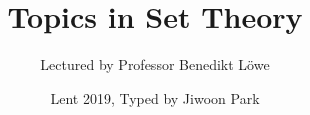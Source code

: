 \documentclass[12pt,a4paper]{article}
\newcommand{\latinmodern}[1]{{\fontfamily{lmss}\selectfont
\textbf{#1}
}}
\DeclarePairedDelimiter\bignorm{\lVert}{\rVert}
\newcommand{\doublerule}[1][.4pt]{%
  \noindent
  \makebox[0pt][l]{\rule[.7ex]{\linewidth}{#1}}%
  \rule[.3ex]{\linewidth}{#1}}
\begin{document}
\title{Topics in Set Theory}
\author{Lectured by Professor Benedikt Löwe}
\date{Lent 2019, Typed by Jiwoon Park}

\maketitle

\newcommand{\statement}[1]{\latinmodern{\textbf{#1) }}}

\newcommand{\thm}{\statement{Theorem}}
\newcommand{\thmnum}[1]{\statement{Theorem #1}}
\newcommand{\defi}{\statement{Definition}}
\newcommand{\definum}[1]{\statement{Definition #1}}
\newcommand{\lem}{\statement{Lemma}}
\newcommand{\lemnum}[1]{\statement{Lemma #1}}
\newcommand{\prop}{\statement{Proposition}}
\newcommand{\propnum}[1]{\statement{Proposition #1}}
\newcommand{\corr}{\statement{Corollary}}
\newcommand{\corrnum}[1]{\statement{Corollary #1}}
\newcommand{\pf}{\textbf{proof) }}

\newcommand{\zfc}{\text{ZFC}}
\newcommand{\ch}{\text{CH}}
\newcommand{\cons}{\text{Cons}}
\newcommand{\proves}{\vdash}

\newcommand{\lap}{\triangle} %
\newcommand{\s}{\vspace{10pt}}
\newcommand{\reals}{\mathbb{R}}
\newcommand{\forces}{\mathrel{\raisebox{0pt}{\scalebox{1}[1]{$|$}}\mkern-4.0mu\raisebox{0pt}{$-$}\mkern-12.5mu\raisebox{0pt}{\scalebox{1}[1]{$|$}}\mkern-5.0mu\raisebox{0pt}{$-$}}} %

\newcommand{\call}[1]{\quad \cdots\cdots\cdots\,\,(#1)}

\newcommand{\charac}{\bm{1}}

\newcommand{\eop}{\hfill  \textsl{(End of proof)} $\square$} %
\newcommand{\eos}{\hfill  \textsl{(End of statement)} $\square$} %

\newcommand{\norms}[2]{\bignorm[\big]{#1}_{#2}}
\newcommand{\poset}{\mathbb{P}}

\newcommand{\borel}{\mathscr{B}}
\newcommand{\EE}{\mathscr{E}}
\newcommand{\pa}{\partial}

\renewcommand{\vec}{\underline}
\renewcommand{\bar}{\overline}

\def\doubleunderline#1{\underline{\underline{#1}}}

\newcommand{\newday}{\doublerule[0.5pt]}
\newcommand{\digression}{**********************************************************************************************}
\end{document}
